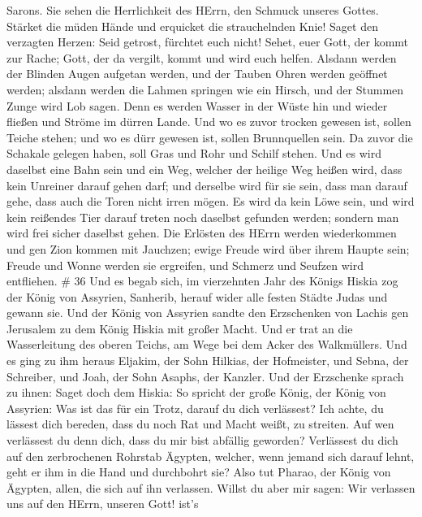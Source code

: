 Sarons. Sie sehen die Herrlichkeit des HErrn, den Schmuck unseres
Gottes.  Stärket die müden Hände und erquicket die
strauchelnden Knie!  Saget den verzagten Herzen: Seid
getrost, fürchtet euch nicht! Sehet, euer Gott, der kommt zur Rache;
Gott, der da vergilt, kommt und wird euch helfen.  Alsdann
werden der Blinden Augen aufgetan werden, und der Tauben Ohren werden
geöffnet werden;  alsdann werden die Lahmen springen wie ein
Hirsch, und der Stummen Zunge wird Lob sagen. Denn es werden Wasser in
der Wüste hin und wieder fließen und Ströme im dürren Lande.
 Und wo es zuvor trocken gewesen ist, sollen Teiche stehen;
und wo es dürr gewesen ist, sollen Brunnquellen sein. Da zuvor die
Schakale gelegen haben, soll Gras und Rohr und Schilf stehen.
 Und es wird daselbst eine Bahn sein und ein Weg, welcher
der heilige Weg heißen wird, dass kein Unreiner darauf gehen darf; und
derselbe wird für sie sein, dass man darauf gehe, dass auch die Toren
nicht irren mögen.  Es wird da kein Löwe sein, und wird kein
reißendes Tier darauf treten noch daselbst gefunden werden; sondern man
wird frei sicher daselbst gehen.  Die Erlösten des HErrn
werden wiederkommen und gen Zion kommen mit Jauchzen; ewige Freude wird
über ihrem Haupte sein; Freude und Wonne werden sie ergreifen, und
Schmerz und Seufzen wird entfliehen. \# 36  Und es begab
sich, im vierzehnten Jahr des Königs Hiskia zog der König von Assyrien,
Sanherib, herauf wider alle festen Städte Judas und gewann sie.
 Und der König von Assyrien sandte den Erzschenken von
Lachis gen Jerusalem zu dem König Hiskia mit großer Macht. Und er trat
an die Wasserleitung des oberen Teichs, am Wege bei dem Acker des
Walkmüllers.  Und es ging zu ihm heraus Eljakim, der Sohn
Hilkias, der Hofmeister, und Sebna, der Schreiber, und Joah, der Sohn
Asaphs, der Kanzler.  Und der Erzschenke sprach zu ihnen:
Saget doch dem Hiskia: So spricht der große König, der König von
Assyrien: Was ist das für ein Trotz, darauf du dich verlässest?
 Ich achte, du lässest dich bereden, dass du noch Rat und
Macht weißt, zu streiten. Auf wen verlässest du denn dich, dass du mir
bist abfällig geworden?  Verlässest du dich auf den
zerbrochenen Rohrstab Ägypten, welcher, wenn jemand sich darauf lehnt,
geht er ihm in die Hand und durchbohrt sie? Also tut Pharao, der König
von Ägypten, allen, die sich auf ihn verlassen.  Willst du
aber mir sagen: Wir verlassen uns auf den HErrn, unseren Gott! ist's
